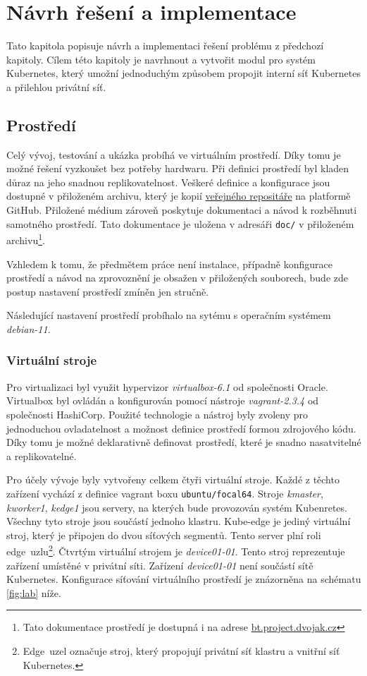 \chapter{Návrh řešení a implementace}
\begin{chapterabstract}
Tato kapitola popisuje návrh a implementaci řešení problému z předchozí kapitoly. Cílem této kapitoly je navrhnout a vytvořit modul pro systém Kubernetes, který umožní jednoduchým způsobem propojit interní síť Kubernetes a přilehlou privátní síť.
\end{chapterabstract}

\section{Prostředí}\label{prostredi}
Celý vývoj, testování a ukázka probíhá ve virtuálním prostředí. Díky tomu je možné řešení vyzkoušet bez potřeby hardwaru. Při definici prostředí byl kladen důraz na jeho snadnou replikovatelnost. Veškeré definice a konfigurace jsou dostupné v přiloženém archivu, který je kopií \href{https://github.com/dvojak-cz/Bachelor-Thesis}{veřejného repositáře} na platformě GitHub. Přiložené médium zároveň poskytuje dokumentaci a návod k rozběhnuti samotného prostředí. Tato dokumentace je uložena v adresáři \verb|doc/| v přiloženém archivu\footnote{Tato dokumentace prostředí je dostupná i na adrese \href{https://bt.project.dvojak.cz/}{bt.project.dvojak.cz}}.

Vzhledem k tomu, že předmětem práce není instalace, případně konfigurace prostředí a návod na zprovoznění je obsažen v přiložených souborech, bude zde postup nastavení prostředí zmíněn jen stručně.

Následující nastavení prostředí probíhalo na sytému s operačním systémem \textit{debian-11}.
\subsection{Virtuální stroje}
Pro virtualizaci byl využit hypervizor \textit{virtualbox-6.1} od společnosti Oracle. Virtualbox byl ovládán a konfigurován pomocí nástroje \textit{vagrant-2.3.4} od společnosti HashiCorp. Použité technologie a nástroj byly zvoleny pro jednoduchou ovladatelnost a možnost definice prostředí formou zdrojového kódu. Díky tomu je možné deklarativně definovat prostředí, které je snadno nasatvitelné a replikovatelné. 

Pro účely vývoje byly vytvořeny celkem čtyři virtuální stroje. Každé z těchto zařízení vychází z definice vagrant boxu \verb|ubuntu/focal64|. Stroje \textit{kmaster}, \textit{kworker1}, \textit{kedge1} jsou servery, na kterých bude provozován systém Kubenretes. Všechny tyto stroje jsou součástí jednoho klastru. Kube-edge je jediný virtuální stroj, který je připojen do dvou síťových segmentů. Tento server plní roli edge~uzlu\footnote{Edge~uzel označuje stroj, který propojují privátní síť klastru a vnitřní síť Kubernetes.}. Čtvrtým virtuální strojem je \textit{device01-01}. Tento stroj reprezentuje zařízení umístěné v privátní síti. Zařízení \textit{device01-01} není součástí sítě Kubernetes. Konfigurace síťování virtuálního prostředí je znázorněna na schématu \ref{fig:lab} níže.

